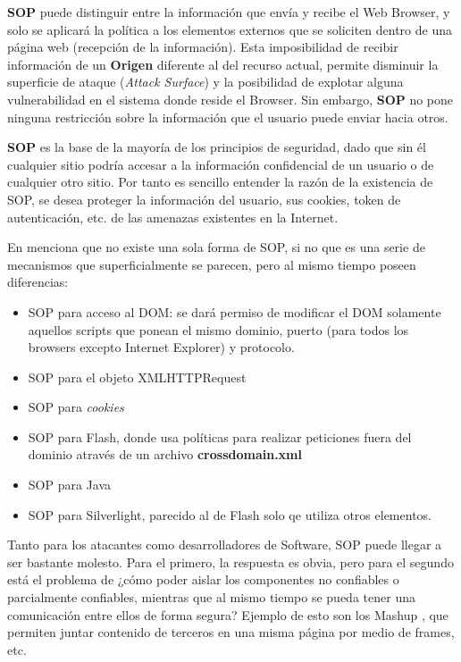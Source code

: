     \textbf{SOP} puede distinguir entre la información que envía y recibe el Web Browser, y solo se aplicará la política a los elementos externos que se soliciten dentro de una página web (recepción de la información). Esta imposibilidad de recibir información de un \textbf{Origen} diferente al del recurso actual, permite disminuir la superficie de ataque (\textit{Attack Surface}) y la posibilidad de explotar alguna vulnerabilidad en el sistema donde reside el Browser. Sin embargo, \textbf{SOP} no pone ninguna restricción sobre la información que el usuario puede enviar hacia otros. 

    \textbf{SOP} es la base de la mayoría de los principios de seguridad, dado que sin él cualquier sitio podría accesar a la información confidencial de un usuario o de cualquier otro sitio. Por tanto es sencillo entender la razón de la existencia de SOP, se desea proteger la información del usuario, sus cookies, token de autenticación, etc. de las amenazas existentes en la Internet.


    En \cite{Zalewsk08} menciona que no existe una sola forma de SOP, si no que es una serie de mecanismos que superficialmente se parecen, pero al mismo tiempo poseen diferencias:

    \begin{itemize}
        \item SOP para acceso al DOM: se dará permiso de modificar el DOM solamente aquellos scripts que ponean el mismo dominio, puerto (para todos los browsers excepto Internet Explorer) y protocolo.
        \item SOP para el objeto XMLHTTPRequest
        \item SOP para \textit{cookies}
        \item SOP para Flash, donde usa políticas para realizar peticiones fuera del dominio através de un archivo \textbf{crossdomain.xml}
        \item SOP para Java
        \item SOP para Silverlight, parecido al de Flash solo qe utiliza otros elementos.
    \end{itemize}

        
   Tanto para los atacantes como desarrolladores de Software, SOP puede llegar a ser bastante molesto. Para el primero, la respuesta es obvia, pero para el segundo está el problema de ¿cómo poder aislar los componentes no confiables o parcialmente confiables, mientras que al mismo tiempo se pueda tener una comunicación entre ellos de forma segura? Ejemplo de esto son los Mashup \cite{barth2009securing}, que permiten juntar contenido de terceros en una misma página por medio de frames, etc. 
        
